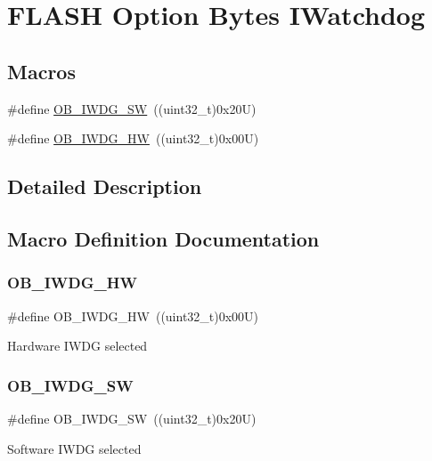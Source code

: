 \hypertarget{group___f_l_a_s_h_ex___option___bytes___i_watchdog}{}\section{F\+L\+A\+SH Option Bytes I\+Watchdog}
\label{group___f_l_a_s_h_ex___option___bytes___i_watchdog}
\subsection*{Macros}
\begin{DoxyCompactItemize}
\item 
\#define \mbox{\hyperlink{group___f_l_a_s_h_ex___option___bytes___i_watchdog_ga5a357e232c955444c3f2ccb9a937ffce}{O\+B\+\_\+\+I\+W\+D\+G\+\_\+\+SW}}~((uint32\+\_\+t)0x20\+U)
\item 
\#define \mbox{\hyperlink{group___f_l_a_s_h_ex___option___bytes___i_watchdog_gadfcbfa963d79c339ec8e2d5a7734e47a}{O\+B\+\_\+\+I\+W\+D\+G\+\_\+\+HW}}~((uint32\+\_\+t)0x00\+U)
\end{DoxyCompactItemize}


\subsection{Detailed Description}


\subsection{Macro Definition Documentation}
\mbox{\label{group___f_l_a_s_h_ex___option___bytes___i_watchdog_gadfcbfa963d79c339ec8e2d5a7734e47a}} 
\subsubsection{\texorpdfstring{OB\_IWDG\_HW}{OB\_IWDG\_HW}}
{\footnotesize\ttfamily \#define O\+B\+\_\+\+I\+W\+D\+G\+\_\+\+HW~((uint32\+\_\+t)0x00\+U)}

Hardware I\+W\+DG selected \mbox{\label{group___f_l_a_s_h_ex___option___bytes___i_watchdog_ga5a357e232c955444c3f2ccb9a937ffce}} 
\subsubsection{\texorpdfstring{OB\_IWDG\_SW}{OB\_IWDG\_SW}}
{\footnotesize\ttfamily \#define O\+B\+\_\+\+I\+W\+D\+G\+\_\+\+SW~((uint32\+\_\+t)0x20\+U)}

Software I\+W\+DG selected 